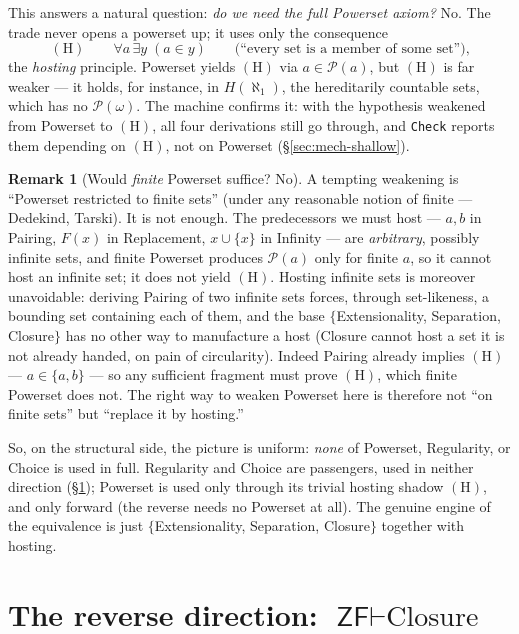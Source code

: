 \documentclass[11pt]{article}
\theoremstyle{plain}
\theoremstyle{definition}
\newtheorem{remark}[theorem]{Remark}
\newcommand{\Pow}{\mathcal{P}}
\newcommand{\ZF}{\mathsf{ZF}}
\renewcommand{\ZF}{\textsf{ZF}}
\newcommand{\proves}{\vdash}
\newcommand{\cq}[1]{\lstinline[basicstyle=\ttfamily]|#1|}
\begin{document}
This answers a natural question: \emph{do we need the full Powerset axiom?} No. The
trade never opens a powerset up; it uses only the consequence
\[
  (\mathrm H)\qquad \forall a\,\exists y\;(a \in y)
  \qquad\text{(``every set is a member of some set''),}
\]
the \emph{hosting} principle. Powerset yields $(\mathrm H)$ via $a \in \Pow(a)$, but
$(\mathrm H)$ is far weaker --- it holds, for instance, in $H(\aleph_1)$, the
hereditarily countable sets, which has no $\Pow(\omega)$. The machine confirms it:
with the hypothesis weakened from Powerset to $(\mathrm H)$, all four derivations
still go through, and \cq{Check} reports them depending on $(\mathrm H)$, not on
Powerset (\S\ref{sec:mech-shallow}).

\begin{remark}[Would \emph{finite} Powerset suffice? No]\label{rem:finitepow}
A tempting weakening is ``Powerset restricted to finite sets'' (under any reasonable
notion of finite --- Dedekind, Tarski). It is not enough. The predecessors we must
host --- $a, b$ in Pairing, $F(x)$ in Replacement, $x \cup \{x\}$ in Infinity --- are
\emph{arbitrary}, possibly infinite sets, and finite Powerset produces $\Pow(a)$ only
for finite $a$, so it cannot host an infinite set; it does not yield $(\mathrm H)$.
Hosting infinite sets is moreover unavoidable: deriving Pairing of two infinite sets
forces, through set-likeness, a bounding set containing each of them, and the base
$\{$Extensionality, Separation, Closure$\}$ has no other way to manufacture a host
(Closure cannot host a set it is not already handed, on pain of circularity). Indeed
Pairing already implies $(\mathrm H)$ --- $a \in \{a,b\}$ --- so any sufficient
fragment must prove $(\mathrm H)$, which finite Powerset does not. The right way to
weaken Powerset here is therefore not ``on finite sets'' but ``replace it by
hosting.''
\end{remark}

So, on the structural side, the picture is uniform: \emph{none} of Powerset,
Regularity, or Choice is used in full. Regularity and Choice are passengers, used in
neither direction (\S\ref{sec:reverse}); Powerset is used only through its trivial
hosting shadow $(\mathrm H)$, and only forward (the reverse needs no Powerset at
all). The genuine engine of the equivalence is just
$\{$Extensionality, Separation, Closure$\}$ together with hosting.

\section{The reverse direction: \texorpdfstring{$\ZF \proves \text{Closure}$}{ZF proves Closure}}\label{sec:reverse}
\end{document}
